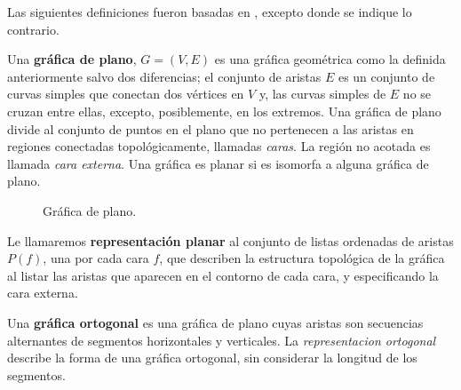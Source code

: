 Las siguientes definiciones fueron basadas en \cite{tamassia}, excepto donde se indique lo contrario.

\begin{definition}
Una \textbf{gr\'afica de plano}, $G=(V, E)$ es una gr\'afica geom\'etrica como la definida anteriormente salvo dos diferencias; el conjunto de aristas $E$ es un conjunto de curvas simples que conectan dos v\'ertices en $V$ y, las curvas simples de $E$ no se cruzan entre ellas, excepto, posiblemente, en los extremos. Una gr\'afica de plano divide al conjunto de puntos en el plano que no pertenecen a las aristas en regiones conectadas topológicamente, llamadas \emph{caras}. La región no acotada es llamada \emph{cara externa}. Una gr\'afica es planar si es isomorfa a alguna gr\'afica de plano.
\end{definition}

\begin{figure}
  \caption{Gr\'afica de plano.}
\end{figure}

\begin{definition}
Le llamaremos \textbf{representaci\'on planar} al conjunto de listas ordenadas de aristas $P(f)$, una por cada cara $f$, que describen la estructura topol\'ogica de la gr\'afica al listar las aristas que aparecen en el contorno de cada cara, y especificando la cara externa.
\end{definition}

\begin{definition}
Una \textbf{gr\'afica ortogonal} es una gr\'afica de plano cuyas aristas son secuencias alternantes de segmentos horizontales y verticales. La \emph{representacion ortogonal} describe la forma de una gr\'afica ortogonal, sin considerar la longitud de los segmentos.
\end{definition}

